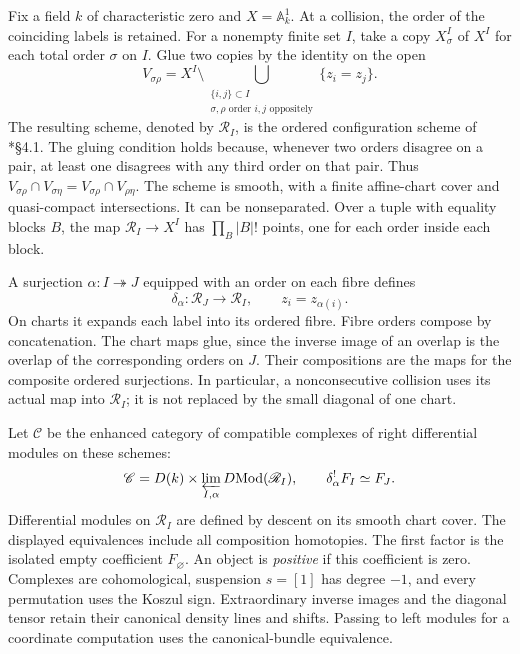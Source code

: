 Fix a field $k$ of characteristic zero and $X=\mathbb A^1_k$.
At a collision, the order of the coinciding labels is retained.
For a nonempty finite set $I$, take a copy $X^I_\sigma$ of $X^I$
for each total order $\sigma$ on $I$. Glue two copies by the identity
on the open
\[
 V_{\sigma\rho}=X^I\setminus
 \bigcup_{\substack{\{i,j\}\subset I\\
                  \sigma,\rho\text{ order }i,j\text{ oppositely}}}
                  \{z_i=z_j\}.
\]
The resulting scheme, denoted by $\mathscr R_I$, is the ordered
configuration scheme of \cite{AKY2024}*{\S4.1}. The gluing condition
holds because, whenever two orders disagree on a pair, at least one
disagrees with any third order on that pair. Thus
$V_{\sigma\rho}\cap V_{\sigma\eta}
 =V_{\sigma\rho}\cap V_{\rho\eta}$.
The scheme is smooth, with a finite affine-chart cover and
quasi-compact intersections. It can be nonseparated. Over a tuple with
equality blocks $B$, the map $\mathscr R_I\to X^I$ has
$\prod_B|B|!$ points, one for each order inside each block.

A surjection $\alpha:I\twoheadrightarrow J$ equipped with an order
on each fibre defines
\[
 \delta_\alpha:\mathscr R_J\longrightarrow\mathscr R_I,
 \qquad z_i=z_{\alpha(i)}.
\]
On charts it expands each label into its ordered fibre. Fibre orders
compose by concatenation. The chart maps glue, since the inverse image
of an overlap is the overlap of the corresponding orders on $J$.
Their compositions are the maps for the composite ordered surjections.
In particular, a nonconsecutive collision uses its actual map into
$\mathscr R_I$; it is not replaced by the small diagonal of one chart.

Let $\mathscr C$ be the enhanced category of compatible complexes of
right differential modules on these schemes:
\begin{equation}\label{eq:vol2-action-category}
 \mathscr C=D(k)\times
     \varprojlim_{I,\alpha}D\!\operatorname{Mod}(\mathscr R_I),
 \qquad \delta_\alpha^!F_I\simeq F_J.
\end{equation}
Differential modules on $\mathscr R_I$ are defined by descent on its
smooth chart cover. The displayed equivalences include all composition
homotopies. The first factor is the isolated empty coefficient
$F_\varnothing$. An object is \emph{positive} if this coefficient is
zero. Complexes are cohomological, suspension $s=[1]$ has degree $-1$,
and every permutation uses the Koszul sign. Extraordinary inverse
images and the diagonal tensor retain their canonical density lines
and shifts. Passing to left modules for a coordinate computation uses
the canonical-bundle equivalence.

